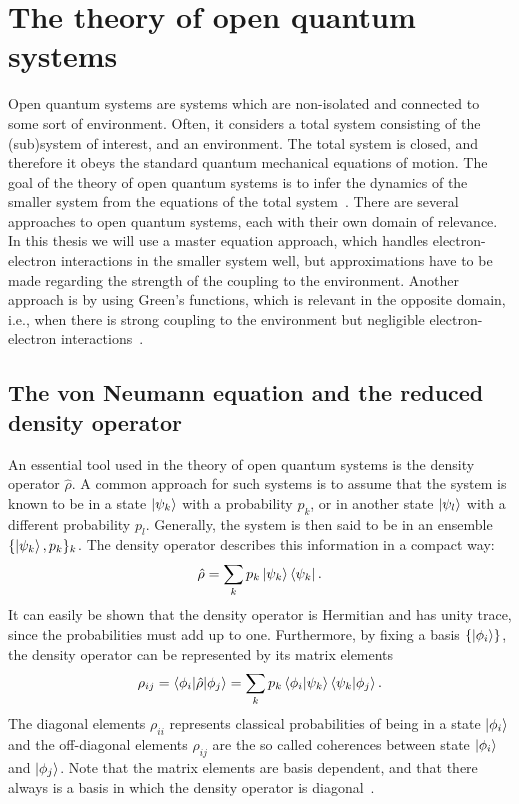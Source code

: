 \documentclass[../main.tex]{subfiles}
\begin{document}
\section{The theory of open quantum systems}
Open quantum systems are systems which are non-isolated and connected to some sort of environment. Often, it considers a total system consisting of the (sub)system of interest, and an environment. The total system is closed, and therefore it obeys the standard quantum mechanical equations of motion. The goal of the theory of open quantum systems is to infer the dynamics of the smaller system from the equations of the total system~\cite{lindblad}. There are several approaches to open quantum systems, each with their own domain of relevance. In this thesis we will use a master equation approach, which handles electron-electron interactions in the smaller system well, but approximations have to be made regarding the strength of the coupling to the environment. Another approach is by using Green's functions, which is relevant in the opposite domain, i.e., when there is strong coupling to the environment but negligible electron-electron interactions~\cite{bruus2004many}.

\subsection{The von Neumann equation and the reduced density operator}

An essential tool used in the theory of open quantum systems is the density operator $\hat{\rho}$. A common approach for such systems is to assume that the system is known to be in a state $\ket{\psi_k}$ with a probability $p_k$, or in another state $\ket{\psi_l}$ with a different probability $p_l$. Generally, the system is then said to be in an ensemble $\{\ket{\psi_k}, p_k\}_k$. The density operator describes this information in a compact way:
\begin{equation}
    \hat{\rho} = \sum_k p_k \ket{\psi_k}\bra{\psi_k}.
\end{equation}
It can easily be shown that the density operator is Hermitian and has unity trace, since the probabilities must add up to one. Furthermore, by fixing a basis $\{\ket{\phi_i}\}$, the density operator can be represented by its matrix elements 
\begin{equation}
    \rho_{ij} = \braket{\phi_i|\hat\rho|\phi_j} = \sum_k p_k \braket{\phi_i|\psi_k}\braket{\psi_k|\phi_j}.
\end{equation}
The diagonal elements $\rho_{ii}$ represents classical probabilities of being in a state $\ket{\phi_i}$ and the off-diagonal elements $\rho_{ij}$ are the so called coherences between state $\ket{\phi_i}$ and $\ket{\phi_j}$. Note that the matrix elements are basis dependent, and that there always is a basis in which the density operator is diagonal~\cite{bookopen}.
\end{document}

